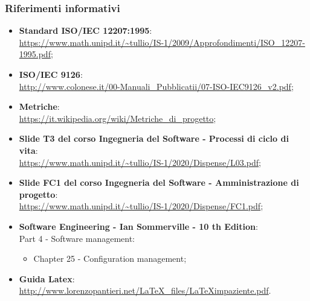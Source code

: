 \subsubsection{Riferimenti informativi}
\begin{itemize}
	\item \textbf{Standard ISO/IEC 12207:1995}: \\
	\textcolor{blue}{\url{https://www.math.unipd.it/~tullio/IS-1/2009/Approfondimenti/ISO_12207-1995.pdf}};
	\item \textbf{ISO/IEC 9126}: \\
	\textcolor{blue}{\url{http://www.colonese.it/00-Manuali_Pubblicatii/07-ISO-IEC9126_v2.pdf}};
	\item \textbf{Metriche}:\\ \textcolor{blue}{\url{https://it.wikipedia.org/wiki/Metriche_di_progetto}};
		\item \textbf{Slide T3 del corso Ingegneria del Software - Processi di ciclo di vita}:\\
	\textcolor{blue}{\url{https://www.math.unipd.it/~tullio/IS-1/2020/Dispense/L03.pdf}};
	
	\item \textbf{Slide FC1 del corso Ingegneria del Software - Amministrazione di progetto}:\\
	\textcolor{blue}{\url{https://www.math.unipd.it/~tullio/IS-1/2020/Dispense/FC1.pdf}};
	
	\item \textbf{Software Engineering - Ian Sommerville - 10 th Edition}: \\
	Part 4 - Software management:
	\begin{itemize}
	\item Chapter 25 - Configuration management;
	\end{itemize}
		
	\item \textbf{Guida Latex}:\\ \textcolor{blue}{\url{http://www.lorenzopantieri.net/LaTeX_files/LaTeXimpaziente.pdf}}.
	
	
\end{itemize}

	

